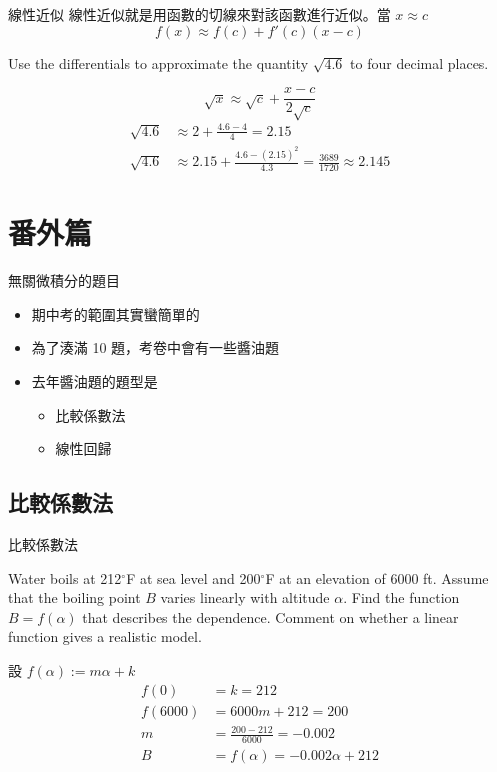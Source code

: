 \documentclass{beamer}
\begin{document}
\begin{CJK}{UTF8}{bsmi}
\begin{frame}{線性近似}
  線性近似就是用函數的切線來對該函數進行近似。當 $x \approx c$
  \[f(x) \approx f(c) + f'(c) \left( x-c \right)\]
  \begin{example}
  Use the differentials to approximate the quantity $\sqrt{4.6}$ to four decimal places.
    \begin{solution}
      \[\sqrt x \approx \sqrt c + \frac{x-c}{2 \sqrt c}\]
      \begin{align*}
	\sqrt{4.6} &\approx 2 + \frac{4.6 - 4}{4} = 2.15\\
	\sqrt{4.6} &\approx 2.15 + \frac{4.6 - (2.15)^2}{4.3} = \frac{3689}{1720} \approx 2.145
      \end{align*}
    \end{solution}
  \end{example}
\end{frame}

\section{番外篇}
\def\proj{\operatorname{proj}}

\begin{frame}{無關微積分的題目}
  \begin{itemize}
    \item 期中考的範圍其實蠻簡單的
    \item 為了湊滿 10 題，考卷中會有一些醬油題
    \item 去年醬油題的題型是
      \begin{itemize}
	\item 比較係數法
	\item 線性回歸
      \end{itemize}
  \end{itemize}
\end{frame}

\subsection{比較係數法}
\begin{frame}{比較係數法}
  \begin{example}
    Water boils at 212$^\circ$F at sea level and 200$^\circ$F at an elevation of 6000 ft. Assume that the boiling point $B$
    varies linearly with altitude $\alpha$. Find the function $B = f(\alpha)$ that describes the dependence. Comment on
    whether a linear function gives a realistic model.
    \begin{solution}
      設 $f(\alpha) := m\alpha + k$
      \begin{align*}
	f(0) &= k = 212\\
	f(6000) &= 6000m + 212 = 200\\
	m &= \frac{200-212}{6000} = -0.002\\
	B &= f(\alpha) = -0.002\alpha + 212
      \end{align*}
    \end{solution}
  \end{example}
\end{frame}


\end{CJK}
\end{document}
